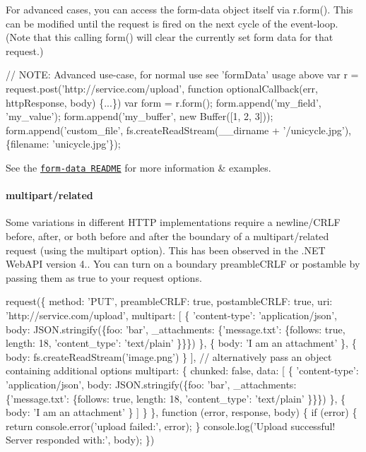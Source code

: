 For advanced cases, you can access the form-\/data object itself via {\ttfamily r.\+form()}. This can be modified until the request is fired on the next cycle of the event-\/loop. (Note that this calling {\ttfamily form()} will clear the currently set form data for that request.)


\begin{DoxyCode}
// NOTE: Advanced use-case, for normal use see 'formData' usage above
var r = request.post('http://service.com/upload', function optionalCallback(err, httpResponse, body) \{...\})
var form = r.form();
form.append('my\_field', 'my\_value');
form.append('my\_buffer', new Buffer([1, 2, 3]));
form.append('custom\_file', fs.createReadStream(\_\_dirname + '/unicycle.jpg'), \{filename: 'unicycle.jpg'\});
\end{DoxyCode}
 See the \href{https://github.com/form-data/form-data}{\tt form-\/data R\+E\+A\+D\+ME} for more information \& examples.

\paragraph*{multipart/related}

Some variations in different H\+T\+TP implementations require a newline/\+C\+R\+LF before, after, or both before and after the boundary of a {\ttfamily multipart/related} request (using the multipart option). This has been observed in the .N\+ET Web\+A\+PI version 4.. You can turn on a boundary preamble\+C\+R\+LF or postamble by passing them as {\ttfamily true} to your request options.


\begin{DoxyCode}
request(\{
  method: 'PUT',
  preambleCRLF: true,
  postambleCRLF: true,
  uri: 'http://service.com/upload',
  multipart: [
    \{
      'content-type': 'application/json',
      body: JSON.stringify(\{foo: 'bar', \_attachments: \{'message.txt': \{follows: true, length: 18,
       'content\_type': 'text/plain' \}\}\})
    \},
    \{ body: 'I am an attachment' \},
    \{ body: fs.createReadStream('image.png') \}
  ],
  // alternatively pass an object containing additional options
  multipart: \{
    chunked: false,
    data: [
      \{
        'content-type': 'application/json',
        body: JSON.stringify(\{foo: 'bar', \_attachments: \{'message.txt': \{follows: true, length: 18,
       'content\_type': 'text/plain' \}\}\})
      \},
      \{ body: 'I am an attachment' \}
    ]
  \}
\},
function (error, response, body) \{
  if (error) \{
    return console.error('upload failed:', error);
  \}
  console.log('Upload successful!  Server responded with:', body);
\})
\end{DoxyCode}



